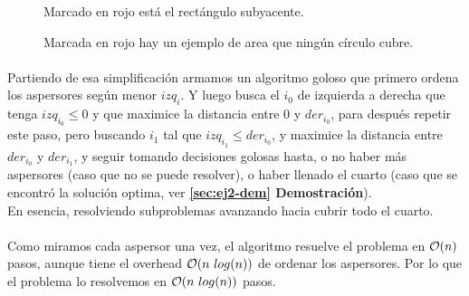 \documentclass[./main.tex]{subfiles}
\begin{document}
\begin{figure}[H]
\centering


\caption{Marcado en rojo está el rectángulo subyacente.}
\label{fig:ej2-simple-sprinkle}
\end{figure}

\begin{figure}[H]
\centering


\caption{Marcada en rojo hay un ejemplo de area que ningún círculo cubre.}
\label{fig:ej2-two-sprinklers}
\end{figure}

\paragraph{} Partiendo de esa simplificación armamos un algoritmo goloso que primero ordena los aspersores según menor \(izq_i\). Y luego busca el \(i_0\) de izquierda a derecha que tenga \(izq_{i_0} \leq 0\) y que maximice la distancia entre 0 y \(der_{i_0}\), para después repetir este paso, pero buscando \(i_1\) tal que \(izq_{i_1} \leq der_{i_0}\), y maximice la distancia entre \(der_{i_0}\) y \(der_{i_1}\), y seguir tomando decisiones golosas hasta, o no haber más aspersores (caso que no se puede resolver), o haber llenado el cuarto (caso que se encontró la solución optima, ver \textbf{\ref{sec:ej2-dem} Demostración}). \\
En esencia, resolviendo subproblemas avanzando hacia cubrir todo el cuarto.

\paragraph{} Como miramos cada aspersor una vez, el algoritmo resuelve el problema en \(\mathcal{O}(n)\) pasos, aunque tiene el overhead \(\mathcal{O}(n\ log(n))\) de ordenar los aspersores. Por lo que el problema lo resolvemos en \(\mathcal{O}(n\ log(n))\) pasos.
\end{document}

